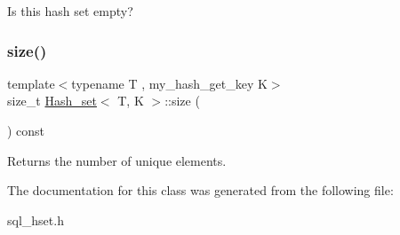 Is this hash set empty? \mbox{\label{classHash__set_af3f6728c422cebd67610c753a41d4231}} 
\subsubsection{\texorpdfstring{size()}{size()}}
{\footnotesize\ttfamily template$<$typename T , my\+\_\+hash\+\_\+get\+\_\+key K$>$ \\
size\+\_\+t \mbox{\hyperlink{classHash__set}{Hash\+\_\+set}}$<$ T, K $>$\+::size (\begin{DoxyParamCaption}{ }\end{DoxyParamCaption}) const\hspace{0.3cm}{\ttfamily [inline]}}

Returns the number of unique elements. 

The documentation for this class was generated from the following file\+:\begin{DoxyCompactItemize}
\item 
sql\+\_\+hset.\+h\end{DoxyCompactItemize}
